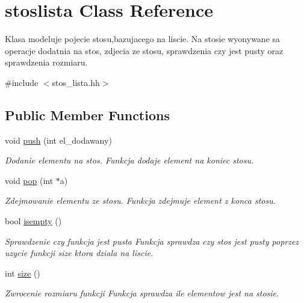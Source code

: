 \hypertarget{classstoslista}{\section{stoslista Class Reference}
\label{classstoslista}
}


Klasa modeluje pojecie stosu,bazujacego na liscie. Na stosie wyonywane sa operacje dodatnia na stos, zdjecia ze stosu, sprawdzenia czy jest pusty oraz sprawdzenia rozmiaru.  




{\ttfamily \#include $<$stos\-\_\-lista.\-hh$>$}

\subsection*{Public Member Functions}
\begin{DoxyCompactItemize}
\item 
void \hyperlink{classstoslista_aadf1d5447cbecd6ff9031732a7a8fa8d}{push} (int el\-\_\-dodawany)
\begin{DoxyCompactList}\small\item\em Dodanie elementu na stos. Funkcja dodaje element na koniec stosu. \end{DoxyCompactList}\item 
void \hyperlink{classstoslista_ab67ebb085a307bffa6c9dd2d6e341cc6}{pop} (int $\ast$a)
\begin{DoxyCompactList}\small\item\em Zdejmowanie elementu ze stosu. Funkcja zdejmuje element z konca stosu. \end{DoxyCompactList}\item 
bool \hyperlink{classstoslista_a723a7adfc6b429210d5b54bc126475e1}{isempty} ()
\begin{DoxyCompactList}\small\item\em Sprawdzenie czy funkcja jest pusta Funkcja sprawdza czy stos jest pusty poprzez uzycie funkcji size ktora dziala na liscie. \end{DoxyCompactList}\item 
int \hyperlink{classstoslista_adc6f1cf66d65fa6c6875ab38bd8ab4c6}{size} ()
\begin{DoxyCompactList}\small\item\em Zwrocenie rozmiaru funkcji Funkcja sprawdza ile elementow jest na stosie. \end{DoxyCompactList}\end{DoxyCompactItemize}


